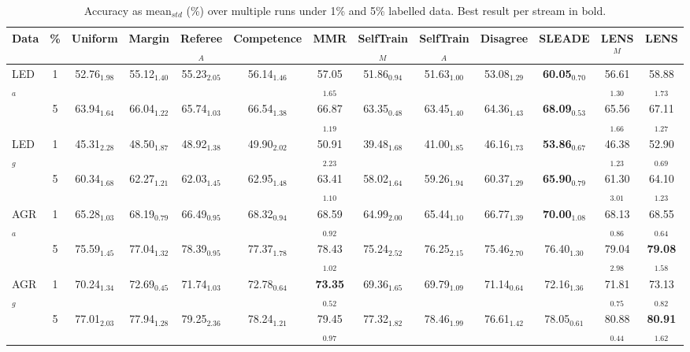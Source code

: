 \begin{table}[t]
\centering
\setlength{\tabcolsep}{2pt}
\renewcommand{\arraystretch}{0.8}
\caption{Accuracy as mean$_{std}$ (\%) over multiple runs under 1\% and 5\% labelled data. Best result per stream in bold.}
\label{tab:results}
\begin{tabular}{l|c|ccccc|cccc|cc}
\toprule
\textbf{Data} & \textbf{\%}
& Uniform & Margin & Referee$_A$ & Competence & MMR
& SelfTrain$_M$ & SelfTrain$_A$ & Disagree & SLEADE
& LENS$^M$ & LENS \\
\midrule

\multirow{2}{*}{LED$_a$}
& 1 & 52.76$_{1.98}$ & 55.12$_{1.40}$ & 55.23$_{2.05}$ & 56.14$_{1.46}$ & 57.05$_{1.65}$ & 51.86$_{0.94}$ & 51.63$_{1.00}$ & 53.08$_{1.29}$ & \textbf{60.05$_{0.70}$} & 56.61$_{1.30}$ & 58.88$_{1.73}$ \\
& 5 & 63.94$_{1.64}$ & 66.04$_{1.22}$ & 65.74$_{1.03}$ & 66.54$_{1.38}$ & 66.87$_{1.19}$ & 63.35$_{0.48}$ & 63.45$_{1.40}$ & 64.36$_{1.43}$ & \textbf{68.09$_{0.53}$} & 65.56$_{1.66}$ & 67.11$_{1.27}$ \\

\multirow{2}{*}{LED$_g$}
& 1 & 45.31$_{2.28}$ & 48.50$_{1.87}$ & 48.92$_{1.38}$ & 49.90$_{2.02}$ & 50.91$_{2.23}$ & 39.48$_{1.68}$ & 41.00$_{1.85}$ & 46.16$_{1.73}$ & \textbf{53.86$_{0.67}$} & 46.38$_{1.23}$ & 52.90$_{0.69}$ \\
& 5 & 60.34$_{1.68}$ & 62.27$_{1.21}$ & 62.03$_{1.45}$ & 62.95$_{1.48}$ & 63.41$_{1.10}$ & 58.02$_{1.64}$ & 59.26$_{1.94}$ & 60.37$_{1.29}$ & \textbf{65.90$_{0.79}$} & 61.30$_{3.01}$ & 64.10$_{1.23}$ \\

\multirow{2}{*}{AGR$_a$}
& 1 & 65.28$_{1.03}$ & 68.19$_{0.79}$ & 66.49$_{0.95}$ & 68.32$_{0.94}$ & 68.59$_{0.92}$ & 64.99$_{2.00}$ & 65.44$_{1.10}$ & 66.77$_{1.39}$ & \textbf{70.00$_{1.08}$} & 68.13$_{0.86}$ & 68.55$_{0.64}$ \\
& 5 & 75.59$_{1.45}$ & 77.04$_{1.32}$ & 78.39$_{0.95}$ & 77.37$_{1.78}$ & 78.43$_{1.02}$ & 75.24$_{2.52}$ & 76.25$_{2.15}$ & 75.46$_{2.70}$ & 76.40$_{1.30}$ & 79.04$_{2.98}$ & \textbf{79.08$_{1.58}$} \\

\multirow{2}{*}{AGR$_g$}
& 1 & 70.24$_{1.34}$ & 72.69$_{0.45}$ & 71.74$_{1.03}$ & 72.78$_{0.64}$ & \textbf{73.35$_{0.52}$} & 69.36$_{1.65}$ & 69.79$_{1.09}$ & 71.14$_{0.64}$ & 72.16$_{1.36}$ & 71.81$_{0.75}$ & 73.13$_{0.82}$ \\
& 5 & 77.01$_{2.03}$ & 77.94$_{1.28}$ & 79.25$_{2.36}$ & 78.24$_{1.21}$ & 79.45$_{0.97}$ & 77.32$_{1.82}$ & 78.46$_{1.99}$ & 76.61$_{1.42}$ & 78.05$_{0.61}$ & 80.88$_{0.44}$ & \textbf{80.91$_{1.62}$} \\


\end{tabular}
\end{table}
